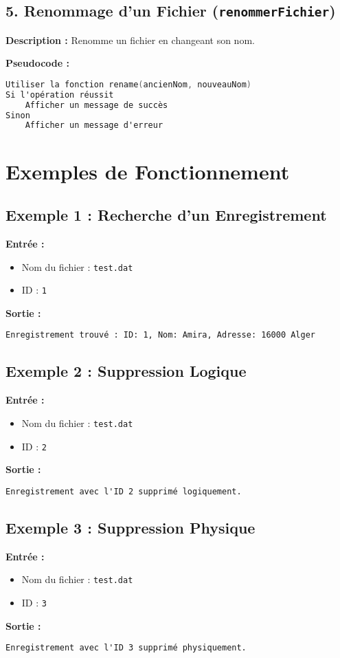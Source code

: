 \documentclass{article}
\begin{document}
\subsection*{5. Renommage d'un Fichier (\texttt{renommerFichier})}
\textbf{Description :} Renomme un fichier en changeant son nom.

\textbf{Pseudocode :}
\begin{lstlisting}[language=C, caption={Pseudocode pour \texttt{renommerFichier}}]
Utiliser la fonction rename(ancienNom, nouveauNom)
Si l'opération réussit
    Afficher un message de succès
Sinon
    Afficher un message d'erreur
\end{lstlisting}

\section*{Exemples de Fonctionnement}

\subsection*{Exemple 1 : Recherche d'un Enregistrement}
\textbf{Entrée :}
\begin{itemize}
    \item Nom du fichier : \texttt{test.dat}
    \item ID : \texttt{1}
\end{itemize}
\textbf{Sortie :}
\begin{verbatim}
Enregistrement trouvé : ID: 1, Nom: Amira, Adresse: 16000 Alger
\end{verbatim}

\subsection*{Exemple 2 : Suppression Logique}
\textbf{Entrée :}
\begin{itemize}
    \item Nom du fichier : \texttt{test.dat}
    \item ID : \texttt{2}
\end{itemize}
\textbf{Sortie :}
\begin{verbatim}
Enregistrement avec l'ID 2 supprimé logiquement.
\end{verbatim}

\subsection*{Exemple 3 : Suppression Physique}
\textbf{Entrée :}
\begin{itemize}
    \item Nom du fichier : \texttt{test.dat}
    \item ID : \texttt{3}
\end{itemize}
\textbf{Sortie :}
\begin{verbatim}
Enregistrement avec l'ID 3 supprimé physiquement.
\end{verbatim}
\end{document}
